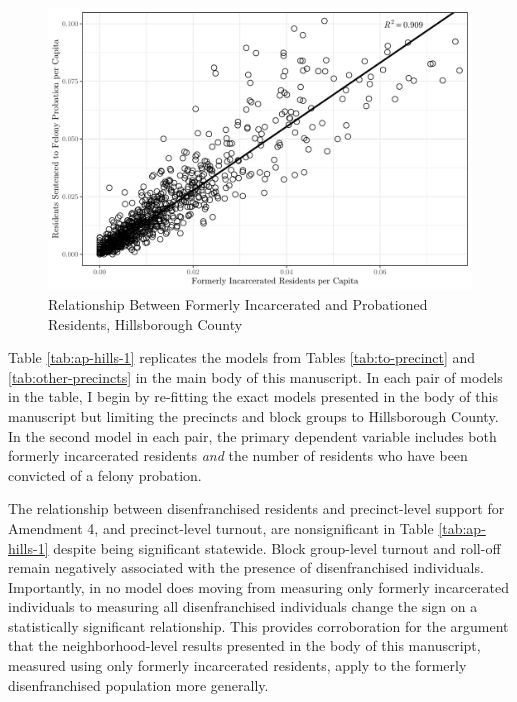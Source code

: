 \documentclass[
  12pt,
]{article}
\begin{document}
\begin{figure}[H]

{\centering \includegraphics{amendment_4_turnout_files/figure-latex/corrplot-1} 

}

\caption{\label{fig:scatter}Relationship Between Formerly Incarcerated and Probationed Residents, Hillsborough County}\label{fig:corrplot}
\end{figure}

Table \ref{tab:ap-hills-1} replicates the models from Tables \ref{tab:to-precinct} and \ref{tab:other-precincts} in the main body of this manuscript. In each pair of models in the table, I begin by re-fitting the exact models presented in the body of this manuscript but limiting the precincts and block groups to Hillsborough County. In the second model in each pair, the primary dependent variable includes both formerly incarcerated residents \emph{and} the number of residents who have been convicted of a felony probation.

\begin{singlespace}


\end{singlespace}

The relationship between disenfranchised residents and precinct-level support for Amendment 4, and precinct-level turnout, are nonsignificant in Table \ref{tab:ap-hills-1} despite being significant statewide. Block group-level turnout and roll-off remain negatively associated with the presence of disenfranchised individuals. Importantly, in no model does moving from measuring only formerly incarcerated individuals to measuring all disenfranchised individuals change the sign on a statistically significant relationship. This provides corroboration for the argument that the neighborhood-level results presented in the body of this manuscript, measured using only formerly incarcerated residents, apply to the formerly disenfranchised population more generally.
\end{document}
